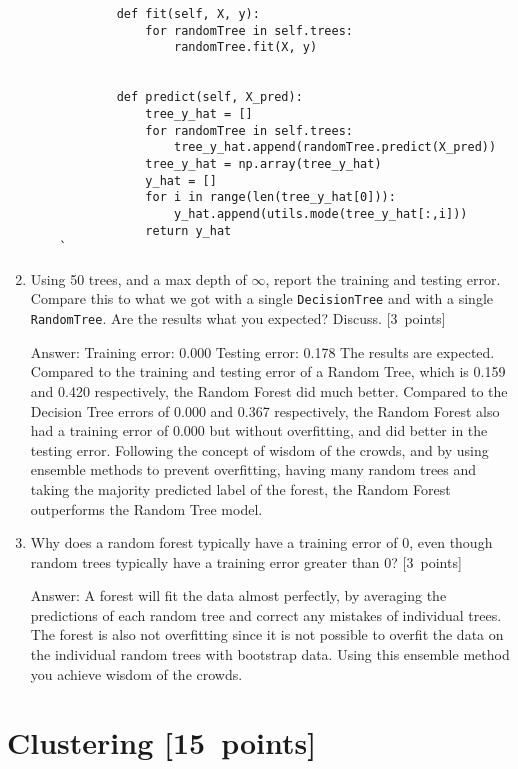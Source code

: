 \documentclass{article}
\newcommand{\blu}[1]{{\textcolor{blu}{#1}}}
\newcommand{\gre}[1]{\textcolor{gre}{#1}}
\newcommand\ans[1]{\par\gre{Answer: #1}}
\let\ask\blu
\newcommand\pts[1]{\textcolor{pointscolour}{[#1~points]}}
\begin{document}
\begin{enumerate}
\begin{verbatim}
            def fit(self, X, y):
                for randomTree in self.trees:
                    randomTree.fit(X, y)
        

            def predict(self, X_pred):
                tree_y_hat = []
                for randomTree in self.trees:
                    tree_y_hat.append(randomTree.predict(X_pred))
                tree_y_hat = np.array(tree_y_hat)
                y_hat = []
                for i in range(len(tree_y_hat[0])):
                    y_hat.append(utils.mode(tree_y_hat[:,i]))
                return y_hat
    `   \end{verbatim}
        
        \item Using 50 trees, and a max depth of $\infty$, \ask{report the training and testing error}. Compare this to what we got with a single \texttt{DecisionTree} and with a single \texttt{RandomTree}. \ask{Are the results what you expected? Discuss.} \pts{3}
        
        \ans{\newline Training error: 0.000 \newline Testing error: 0.178 \newline \newline The results are expected. Compared to the training and testing error of a Random Tree, which is 0.159 and 0.420 respectively, the Random Forest did much better. Compared to the Decision Tree errors of 0.000 and 0.367 respectively, the Random Forest also had a training error of 0.000 but without overfitting, and did better in the testing error. Following the concept of wisdom of the crowds, and by using ensemble methods to prevent overfitting, having many random trees and taking the majority predicted label of the forest, the Random Forest outperforms the Random Tree model.}
        \item \ask{Why does a random forest typically have a training error of 0, even though random trees typically have a training error greater than 0?} \pts{3}

        \ans{A forest will fit the data almost perfectly, by averaging the predictions of each random tree and correct any mistakes of individual trees. The forest is also not overfitting since it is not possible to overfit the data on the individual random trees with bootstrap data. Using this ensemble method you achieve wisdom of the crowds.}
    \end{enumerate}


    \clearpage
    \section{Clustering \pts{15}}
\end{document}
